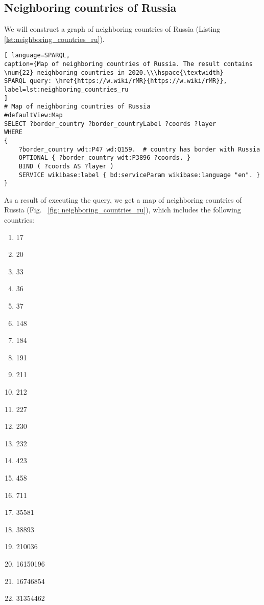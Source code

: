 \subsection{Neighboring countries of Russia}

We will construct a graph of neighboring countries of Russia (Listing \ref{lst:neighboring_countries_ru}).
\begin{lstlisting}[ language=SPARQL, 
caption={Map of neighboring countries of Russia. The result contains \num{22} neighboring countries in 2020.\\\hspace{\textwidth}
SPARQL query: \href{https://w.wiki/rMR}{https://w.wiki/rMR}},
label=lst:neighboring_countries_ru
]
# Map of neighboring countries of Russia
#defaultView:Map
SELECT ?border_country ?border_countryLabel ?coords ?layer
WHERE 
{
	?border_country wdt:P47 wd:Q159.  # country has border with Russia
	OPTIONAL { ?border_country wdt:P3896 ?coords. }
	BIND ( ?coords AS ?layer )
	SERVICE wikibase:label { bd:serviceParam wikibase:language "en". }
}
\end{lstlisting}

As a result of executing the query, we get a map of neighboring countries of Russia (Fig. ~\ref {fig: neighboring_countries_ru}), which includes the following countries:
\begin{enumerate}
	\item {} {17}
	\item {} {20}
	\item {} {33}
	\item {} {36}
	\item {} {37}
	\item {} {148}
	\item {} {184}
	\item {} {191}
	\item {} {211}
	\item {} {212}
	\item {} {227}
	\item {} {230}
	\item {} {232}
	\item {} {423}
	\item {} {458}
	\item {} {711}
	\item {} {35581}
	\item {} {38893}
	\item {} {210036}
	\item {} {16150196}
	\item {} {16746854}
	\item {} {31354462}
\end{enumerate}


